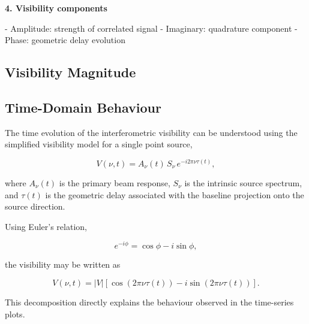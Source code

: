 \documentclass{article}
\begin{document}
\vspace{1em}

\textbf{4. Visibility components}

- Amplitude: strength of correlated signal  
- Imaginary: quadrature component  
- Phase: geometric delay evolution  

\FloatBarrier

\subsection{Visibility Magnitude}

\subsection{Time-Domain Behaviour}

The time evolution of the interferometric visibility can be understood using the simplified visibility model for a single point source,

\begin{equation}
V(\nu,t) = A_\nu(t)\, S_\nu\, e^{-i2\pi\nu\tau(t)},
\end{equation}

where $A_\nu(t)$ is the primary beam response, $S_\nu$ is the intrinsic source spectrum, and $\tau(t)$ is the geometric delay associated with the baseline projection onto the source direction.

Using Euler’s relation,

\begin{equation}
e^{-i\phi} = \cos\phi - i\sin\phi,
\end{equation}

the visibility may be written as

\begin{equation}
V(\nu,t)
=
|V|
\left[
\cos(2\pi\nu\tau(t))
-
i\sin(2\pi\nu\tau(t))
\right].
\end{equation}

This decomposition directly explains the behaviour observed in the time-series plots.
\end{document}
